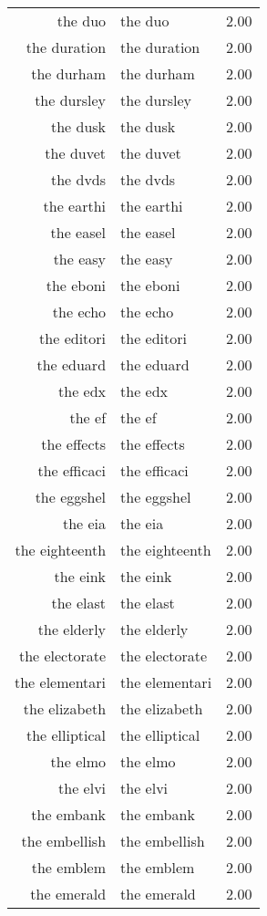 \begin{table}[ht]
\begin{tabular}{rlr}
  the duo & the duo & 2.00 \\ 
  the duration & the duration & 2.00 \\ 
  the durham & the durham & 2.00 \\ 
  the dursley & the dursley & 2.00 \\ 
  the dusk & the dusk & 2.00 \\ 
  the duvet & the duvet & 2.00 \\ 
  the dvds & the dvds & 2.00 \\ 
  the earthi & the earthi & 2.00 \\ 
  the easel & the easel & 2.00 \\ 
  the easy & the easy & 2.00 \\ 
  the eboni & the eboni & 2.00 \\ 
  the echo & the echo & 2.00 \\ 
  the editori & the editori & 2.00 \\ 
  the eduard & the eduard & 2.00 \\ 
  the edx & the edx & 2.00 \\ 
  the ef & the ef & 2.00 \\ 
  the effects & the effects & 2.00 \\ 
  the efficaci & the efficaci & 2.00 \\ 
  the eggshel & the eggshel & 2.00 \\ 
  the eia & the eia & 2.00 \\ 
  the eighteenth & the eighteenth & 2.00 \\ 
  the eink & the eink & 2.00 \\ 
  the elast & the elast & 2.00 \\ 
  the elderly & the elderly & 2.00 \\ 
  the electorate & the electorate & 2.00 \\ 
  the elementari & the elementari & 2.00 \\ 
  the elizabeth & the elizabeth & 2.00 \\ 
  the elliptical & the elliptical & 2.00 \\ 
  the elmo & the elmo & 2.00 \\ 
  the elvi & the elvi & 2.00 \\ 
  the embank & the embank & 2.00 \\ 
  the embellish & the embellish & 2.00 \\ 
  the emblem & the emblem & 2.00 \\ 
  the emerald & the emerald & 2.00 \\ 

\end{tabular}
\end{table}
